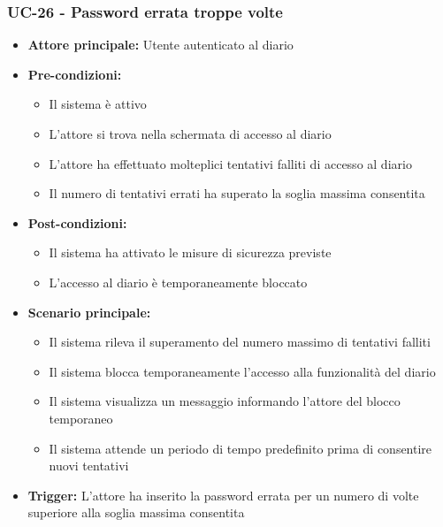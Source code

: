 \documentclass[a4paper,12pt]{article}
\begin{document}
\subsubsection{UC-26 - Password errata troppe volte} \label{subsec:UC-26}
\begin{itemize}
    \item \textbf{Attore principale:} Utente autenticato al diario
    \item \textbf{Pre-condizioni:}
    \begin{itemize}
        \item Il sistema è attivo
        \item L'attore si trova nella schermata di accesso al diario
        \item L'attore ha effettuato molteplici tentativi falliti di accesso al diario
        \item Il numero di tentativi errati ha superato la soglia massima consentita
    \end{itemize}
    \item \textbf{Post-condizioni:} 
    \begin{itemize}
        \item Il sistema ha attivato le misure di sicurezza previste
        \item L'accesso al diario è temporaneamente bloccato
    \end{itemize}
    \item \textbf{Scenario principale:} 
    \begin{itemize}
        \item Il sistema rileva il superamento del numero massimo di tentativi falliti
        \item Il sistema blocca temporaneamente l'accesso alla funzionalità del diario
        \item Il sistema visualizza un messaggio informando l'attore del blocco temporaneo
        \item Il sistema attende un periodo di tempo predefinito prima di consentire nuovi tentativi
    \end{itemize}
    \item \textbf{Trigger:} L'attore ha inserito la password errata per un numero di volte superiore alla soglia massima consentita
\end{itemize}
\end{document}
